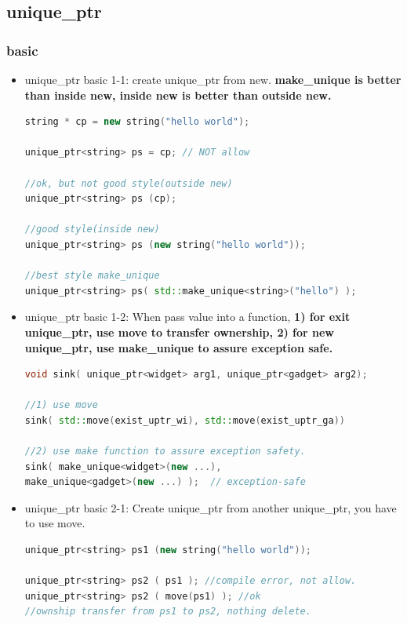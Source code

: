 \documentclass[a4paper,12pt,twoside]{book}
\begin{document}
\subsection{unique\_ptr}

\subsubsection{basic}
\begin{itemize}

\item unique\_ptr basic 1-1: create unique\_ptr from new.    \textbf{make\_unique is better than inside new, inside new is better than outside new.}
\begin{lstlisting}[frame=single, language=c++]
string * cp = new string("hello world");

unique_ptr<string> ps = cp; // NOT allow

//ok, but not good style(outside new)
unique_ptr<string> ps (cp);

//good style(inside new)
unique_ptr<string> ps (new string("hello world"));

//best style make_unique
unique_ptr<string> ps( std::make_unique<string>("hello") );
\end{lstlisting}

\item unique\_ptr basic 1-2: When pass value into a function, \textbf{1) for exit unique\_ptr, use move to transfer ownership, 2) for new unique\_ptr, use make\_unique to assure exception safe.}
\begin{lstlisting}[frame=single, language=c++]
void sink( unique_ptr<widget> arg1, unique_ptr<gadget> arg2);

//1) use move
sink( std::move(exist_uptr_wi), std::move(exist_uptr_ga))

//2) use make function to assure exception safety.
sink( make_unique<widget>(new ...),
make_unique<gadget>(new ...) );  // exception-safe
\end{lstlisting}

\item unique\_ptr basic 2-1: Create unique\_ptr from another unique\_ptr, you have to use move.
\begin{lstlisting}[frame=single, language=c++]
unique_ptr<string> ps1 (new string("hello world"));

unique_ptr<string> ps2 ( ps1 ); //compile error, not allow.
unique_ptr<string> ps2 ( move(ps1) ); //ok
//ownship transfer from ps1 to ps2, nothing delete.
\end{lstlisting}



\end{itemize}
\end{document}
